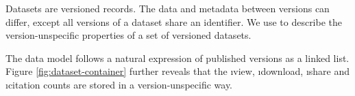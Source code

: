 
  Datasets are versioned records.  The data and metadata between versions
  can differ, except all versions of a dataset share an identifier.  We use
   to describe the version-unspecific properties
  of a set of versioned datasets.


  The data model follows a natural expression of published versions as a
  linked list.  Figure \ref{fig:dataset-container} further reveals that
  the \i{view}, \i{download}, \i{share} and \i{citation} counts are stored
  in a version-unspecific way.

